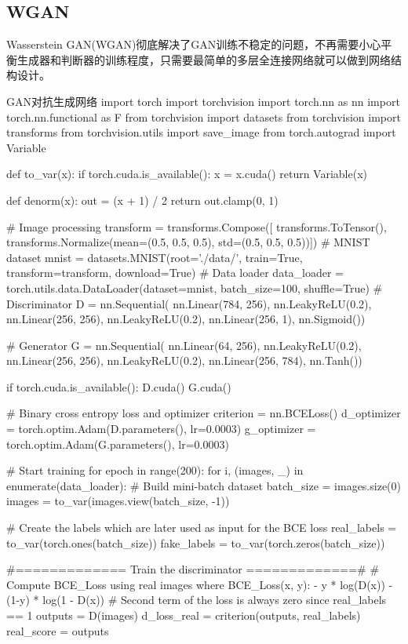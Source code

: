 \documentclass[openbib]{article}
\begin{document}
\subsection{WGAN}
Wasserstein GAN(WGAN)彻底解决了GAN训练不稳定的问题，不再需要小心平衡生成器和判断器的训练程度，只需要最简单的多层全连接网络就可以做到网络结构设计。
\begin{Python}{GAN对抗生成网络}
import torch
import torchvision
import torch.nn as nn
import torch.nn.functional as F
from torchvision import datasets 
from torchvision import transforms
from torchvision.utils import save_image
from torch.autograd import Variable


def to_var(x):
	if torch.cuda.is_available():
		x = x.cuda()
		return Variable(x)

def denorm(x):
	out = (x + 1) / 2
	return out.clamp(0, 1)

# Image processing 
transform = transforms.Compose([
transforms.ToTensor(),
transforms.Normalize(mean=(0.5, 0.5, 0.5), 
std=(0.5, 0.5, 0.5))])
# MNIST dataset
mnist = datasets.MNIST(root='./data/',
train=True,
transform=transform,
download=True)
# Data loader
data_loader = torch.utils.data.DataLoader(dataset=mnist,
batch_size=100, 
shuffle=True)
# Discriminator
D = nn.Sequential(
nn.Linear(784, 256),
nn.LeakyReLU(0.2),
nn.Linear(256, 256),
nn.LeakyReLU(0.2),
nn.Linear(256, 1),
nn.Sigmoid())

# Generator 
G = nn.Sequential(
nn.Linear(64, 256),
nn.LeakyReLU(0.2),
nn.Linear(256, 256),
nn.LeakyReLU(0.2),
nn.Linear(256, 784),
nn.Tanh())

if torch.cuda.is_available():
	D.cuda()
	G.cuda()

# Binary cross entropy loss and optimizer
criterion = nn.BCELoss()
d_optimizer = torch.optim.Adam(D.parameters(), lr=0.0003)
g_optimizer = torch.optim.Adam(G.parameters(), lr=0.0003)

# Start training
for epoch in range(200):
	for i, (images, _) in enumerate(data_loader):
# Build mini-batch dataset
		batch_size = images.size(0)
		images = to_var(images.view(batch_size, -1))

# Create the labels which are later used as input for the BCE loss
real_labels = to_var(torch.ones(batch_size))
fake_labels = to_var(torch.zeros(batch_size))

#============= Train the discriminator =============#
# Compute BCE_Loss using real images where BCE_Loss(x, y): - y * log(D(x)) - (1-y) * log(1 - D(x))
# Second term of the loss is always zero since real_labels == 1
outputs = D(images)
d_loss_real = criterion(outputs, real_labels)
real_score = outputs


\end{Python}
\end{document}
